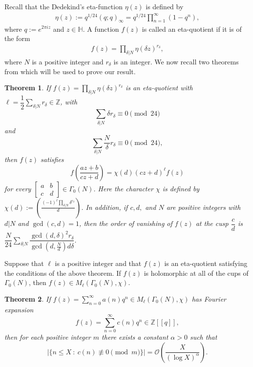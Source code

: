 \documentclass[12pt,reqno]{amsart}
\numberwithin{equation}{section}
\newtheorem{theorem}{Theorem}[section]
\begin{document}
Recall that the Dedekind's eta-function $\eta(z)$ is defined by
\begin{align*}
	\eta(z):=q^{1/24}(q;q)_{\infty}=q^{1/24}\prod_{n=1}^{\infty}(1-q^n),
\end{align*}
where $q:=e^{2\pi iz}$ and $z\in \mathbb{H}$. A function $f(z)$ is called an eta-quotient if it is of the form
\begin{align*}
f(z)=\prod_{\delta|N}\eta(\delta z)^{r_\delta},
\end{align*}
where $N$ is a positive integer and $r_{\delta}$ is an integer. We now recall two theorems from \cite[p. 18]{OnoModularity} which will be used to prove our result.

\begin{theorem}\cite[Theorem 1.64 and Theorem 1.65]{OnoModularity}\label{thm:ono1} If $f(z)=\prod_{\delta|N}\eta(\delta z)^{r_\delta}$ 
is an eta-quotient with $\ell=\dfrac{1}{2}\sum_{\delta|N}r_{\delta}\in \mathbb{Z}$, 
with
	$$\sum_{\delta|N} \delta r_{\delta}\equiv 0 \pmod{24}$$ and
	$$\sum_{\delta|N} \frac{N}{\delta}r_{\delta}\equiv 0 \pmod{24},$$
	then $f(z)$ satisfies $$f\left( \frac{az+b}{cz+d}\right)=\chi(d)(cz+d)^{\ell}f(z)$$
	for every  $\begin{bmatrix}
		a  &  b \\
		c  &  d      
	\end{bmatrix} \in \Gamma_0(N)$. Here the character $\chi$ is defined by $\chi(d):=\left(\frac{(-1)^{\ell} \prod_{\delta |N}\delta^{r_{\delta}}}{d}\right)$. 
	 In addition, if $c, d,$ and $N$ are positive integers with $d|N$ and $\gcd(c, d)=1$, then the order of vanishing of $f(z)$ at the cusp $\dfrac{c}{d}$ 
	is $\dfrac{N}{24}\sum_{\delta|N}\dfrac{\gcd(d,\delta)^2r_{\delta}}{\gcd(d,\frac{N}{d})d\delta}$.
\end{theorem}
Suppose that $\ell$ is a positive integer and that $f(z)$ is an eta-quotient satisfying the conditions of the above theorem. 
If $f(z)$ is holomorphic at all of the cups of $\Gamma_0(N)$, 
then $f(z)\in M_{\ell}(\Gamma_0(N), \chi)$.

\begin{theorem}\cite[due to Serre, p. 43]{OnoModularity}\label{thm:ono2}
    If $f(z)=\sum_{n=0}^\infty a(n)q^n\in M_\ell(\Gamma_0(N), \chi)$ has Fourier expansion
    \[
    f(z)=\sum_{n=0}^\infty c(n)q^n\in \mathbb{Z}[[q]],
    \]
    then for each positive integer $m$ there exists a constant $\alpha>0$ such that
    \[
    |\{n\leq X~:~c(n)\not\equiv0\pmod m\}|=\mathcal{O}\left(\frac{X}{(\log X)^\alpha}\right).
    \]
\end{theorem}
\end{document}
